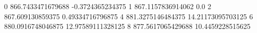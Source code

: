 0 866.7433471679688 -0.3724365234375
1 867.1157836914062 0.0
2 867.609130859375 0.49334716796875
4 881.3275146484375 14.21173095703125
6 880.0916748046875 12.97589111328125
8 877.5617065429688 10.4459228515625
